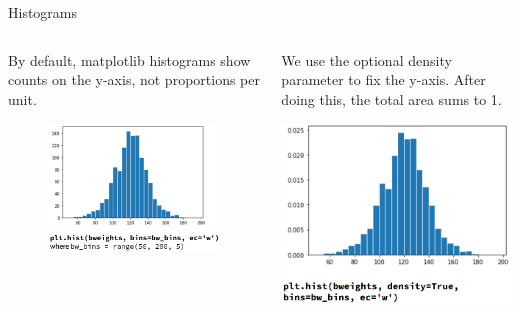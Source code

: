 \documentclass[aspectratio=169]{../latex_main/tntbeamer}  %
\begin{document}
    
    \begin{frame}{Histograms}
        \begin{columns}
            \begin{column}{.4\textwidth}
                   By default, matplotlib histograms show counts on the y-axis, not proportions per unit. 
                   \begin{figure}
                       \includegraphics[scale=.35]{Bild28}
                   \end{figure}
            \end{column}
            
            
            \begin{column}{.4\textwidth}
                We use the optional density parameter to fix the y-axis. After doing this, the total area sums to 1.

                       \includegraphics[scale=.35]{Bild29}

            \end{column}
        \end{columns}
    \end{frame}
    
\end{document}

